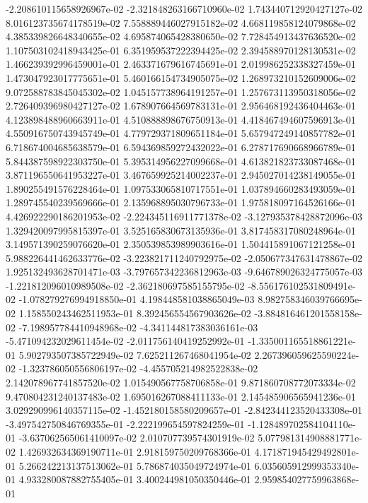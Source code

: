 -2.208610115658926967e-02
-2.321848263166710960e-02
1.743440712920427127e-02
8.016123735674178519e-02
7.558889446027915182e-02
4.668119858124079868e-02
4.385339826648340655e-02
4.695874065428380650e-02
7.728454913437636520e-02
1.107503102418943425e-01
6.351959537222394425e-02
2.394588970128130531e-02
1.466239392996459001e-01
2.463371679616745691e-01
2.019986252338327459e-01
1.473047923017775651e-01
5.460166154734905075e-02
1.268973210152609006e-02
9.072588783845045302e-02
1.045157738964191257e-01
1.257673113950318056e-02
2.726409396980427127e-02
1.678907664569783131e-01
2.956468192436404463e-01
4.123898488960663911e-01
4.510888898676750913e-01
4.418467494607596913e-01
4.550916750743945749e-01
4.779729371809651184e-01
5.657947249140857782e-01
6.718674004685638579e-01
6.594369859272432022e-01
6.278717690668966789e-01
5.844387598922303750e-01
5.395314956227099668e-01
4.613821823733087468e-01
3.871196550641953227e-01
3.467659925214002237e-01
2.945027014238149055e-01
1.890255491576228464e-01
1.097533065810717551e-01
1.037894660283493059e-01
1.289745540239569666e-01
2.135968895030796733e-01
1.975818097164526166e-01
4.426922290186201953e-02
-2.224345116911771378e-02
-3.127935378428872096e-03
1.329420097995815397e-01
3.525165830673135936e-01
3.817458317080248964e-01
3.149571390259076620e-01
2.350539853989903616e-01
1.504415891067121258e-01
5.988226441462633776e-02
-3.223821711240792975e-02
-2.050677347631478867e-02
1.925132493628701471e-03
-3.797657342236812963e-03
-9.646789026324775057e-03
-1.221812096010989508e-02
-2.362180697585155795e-02
-8.556176102531809491e-02
-1.078279276994918850e-01
4.198448581038865049e-03
8.982758346039766695e-02
1.158550243462511953e-01
8.392456554567903626e-02
-3.884816461201558158e-02
-7.198957784410948968e-02
-4.341144817383036161e-03
-5.471094232029611454e-02
-2.011756140419252992e-01
-1.335001165518861221e-01
5.902793507385722949e-02
7.625211267468041954e-02
2.267396059625590224e-02
-1.323786050556806197e-02
-4.455705214982522838e-02
2.142078967741857520e-02
1.015490567758706858e-01
9.871860708772073334e-02
9.470804231240137483e-02
1.695016267088411133e-01
2.145485906565941236e-01
3.029290996140357115e-02
-1.452180158580209657e-01
-2.842344123520433308e-01
-3.497542750846769355e-01
-2.222199654597824259e-01
-1.128489702584104110e-01
-3.637062565061410097e-02
2.010707739574301919e-02
5.077981314908881771e-02
1.426932634369190711e-01
2.918159750209768366e-01
4.171871945429492801e-01
5.266242213137513062e-01
5.786874035049724974e-01
6.035605912999353340e-01
4.933280087882755405e-01
3.400244981050350446e-01
2.959854027759963868e-01
